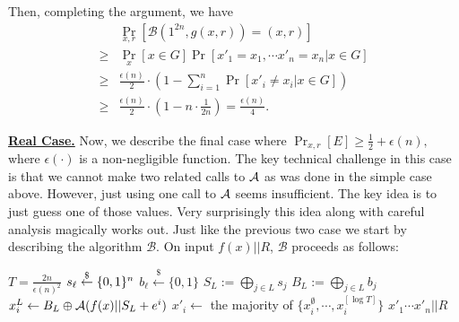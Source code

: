 Then, completing the argument,  we have
\begin{align*}
&\Pr_{x,r}[\mathcal{B}(1^{2n}, g(x,r)) = (x,r)]\\
\geq& \Pr_x [x \in G] \Pr[x'_1 = x_1, \cdots x'_n = x_n | x \in G]\\
\geq& \frac{\epsilon(n)}{2} \cdot \left(1- \sum_{i=1}^n\Pr[x'_i \neq x_i | x \in G]\right)\\
\geq& \frac{\epsilon(n)}{2} \cdot \left(1- n \cdot\frac{1}{2n} \right) =  \frac{\epsilon(n)}{4}.
\end{align*}



\bigskip
\noindent\textbf{\underline{Real Case.}} Now, we describe the final case where $\Pr_{x,r}[E] \geq \frac{1}{2} + \epsilon(n),$
 where $\epsilon(\cdot)$ is a non-negligible function. The key technical challenge in this case is that we cannot make two related calls to ${\mathcal A}$ as was done in the simple case above. However, just using one call to ${\mathcal A}$ seems insufficient. The key idea is to just guess one of those values. Very surprisingly this idea along with careful analysis magically works out.
Just like the previous two case we start by describing the algorithm $\mathcal{B}$. On input $f(x)||R$, $\mathcal{B}$ proceeds as follows:

\medskip
\begin{algorithmic}
\State $T = \frac{2n}{\epsilon(n)^2}$
		\State $s_\ell \stackrel{\$}{\leftarrow} \{ 0, 1 \}^{n}$
		\State $b_\ell \stackrel{\$}{\leftarrow} \{0,1\}$
	\EndFor
{}
		\State $S_L :=\bigoplus_{j \in L} s_j$
		\State $B_L := \bigoplus_{j \in L} b_j$
		\State $x_i^L \leftarrow B_L \oplus {\mathcal A}(f(x) || S_L+e^i)$
	\EndFor
	\State $x'_i \gets $ the majority of $\{x_i^\emptyset, \cdots, x_i^{[\log T]}\}$
\EndFor
\State \Return $x'_1\cdots x'_n||R$
\end{algorithmic}

